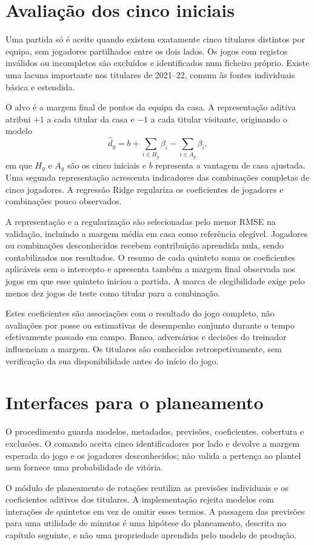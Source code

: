 \section{Avaliação dos cinco iniciais}

Uma partida só é aceite quando existem exatamente cinco titulares distintos
por equipa, sem jogadores partilhados entre os dois lados. Os jogos com
registos inválidos ou incompletos são excluídos e identificados num ficheiro
próprio. Existe uma lacuna importante nos titulares de 2021--22, comum às
fontes individuais básica e estendida.

O alvo é a margem final de pontos da equipa da casa. A representação
aditiva atribui \(+1\) a cada titular da casa e \(-1\) a cada titular
visitante, originando o modelo
\[
\widehat{d}_g=b+\sum_{i\in H_g}\beta_i-\sum_{i\in A_g}\beta_i,
\]
em que \(H_g\) e \(A_g\) são os cinco iniciais e \(b\) representa a vantagem
de casa ajustada. Uma segunda representação acrescenta indicadores das
combinações completas de cinco jogadores. A regressão Ridge regulariza
os coeficientes de jogadores e combinações pouco observados.

A representação e a regularização são selecionadas pelo menor RMSE na
validação, incluindo a margem média em casa como referência elegível.
Jogadores ou combinações desconhecidos recebem contribuição aprendida
nula, sendo contabilizados nos resultados. O resumo de cada quinteto soma
os coeficientes aplicáveis sem o intercepto e apresenta também a margem
final observada nos jogos em que esse quinteto iniciou a partida.
A marca de elegibilidade exige pelo menos dez jogos de teste como titular
para a combinação.

Estes coeficientes são associações com o resultado do jogo completo,
não avaliações por posse ou estimativas de desempenho conjunto durante
o tempo efetivamente passado em campo. Banco, adversários e decisões do
treinador influenciam a margem. Os titulares são conhecidos retrospetivamente,
sem verificação da sua disponibilidade antes do início do jogo.

\section{Interfaces para o planeamento}

O procedimento  guarda modelos,
metadados, previsões, coeficientes, cobertura e exclusões. O comando
 aceita cinco identificadores por lado
e devolve a margem esperada do jogo e os jogadores desconhecidos; não
valida a pertença ao plantel nem fornece uma probabilidade de vitória.

O módulo de planeamento de rotações reutiliza as previsões individuais e os coeficientes aditivos
dos titulares. A implementação rejeita modelos com interações de quintetos
em vez de omitir esses termos. A passagem das previsões para uma utilidade
de minutos é uma hipótese do planeamento, descrita no capítulo seguinte,
e não uma propriedade aprendida pelo modelo de produção.
